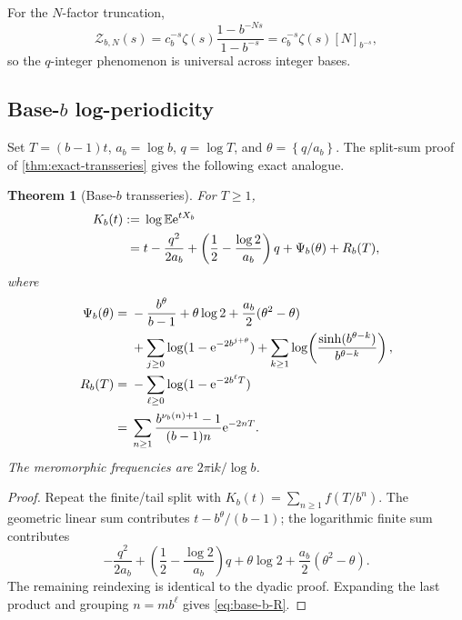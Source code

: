 \documentclass[11pt,oneside]{article}
\newtheorem{theorem}{Theorem}[section]
\theoremstyle{definition}
\theoremstyle{remark}
\newcommand{\e}{\mathrm e}
\newcommand{\ii}{\mathrm i}
\newcommand{\E}{\mathbb E}
\begin{document}
For the \(N\)-factor truncation,
\begin{equation}
 \mathcal Z_{b,N}(s)
 =c_b^{-s}\zeta(s)
  \frac{1-b^{-Ns}}{1-b^{-s}}
 =c_b^{-s}\zeta(s)[N]_{b^{-s}},
 \label{eq:base-b-qinteger}
\end{equation}
so the \(q\)-integer phenomenon is universal across integer bases.

\subsection{Base-\(b\) log-periodicity}

Set \(T=(b-1)t\), \(a_b=\log b\), \(q=\log T\), and
\(\theta=\left\{q/a_b\right\}\).  The split-sum proof of
\cref{thm:exact-transseries} gives the following exact analogue.

\begin{theorem}[Base-\(b\) transseries]
\label{thm:base-b-transseries}
For \(T\geq1\),
\begin{align}
 K_b(t)
 :={}&\log\E\e^{tX_b}
 \notag\\
 ={}&
 t-\frac{q^2}{2a_b}
 +\left(\frac12-\frac{\log2}{a_b}\right)q
 +\Psi_b(\theta)+R_b(T),
 \label{eq:base-b-K}
\end{align}
where
\begin{align}
 \Psi_b(\theta)
 ={}&
 -\frac{b^\theta}{b-1}
 +\theta\log2+\frac{a_b}{2}(\theta^2-\theta)
 \notag\\
 &+\sum_{j\geq0}\log(1-\e^{-2b^{j+\theta}})
 +\sum_{k\geq1}
   \log\!\left(\frac{\sinh(b^{\theta-k})}{b^{\theta-k}}\right),
 \label{eq:base-b-Psi}\\
 R_b(T)
 ={}&
 -\sum_{\ell\geq0}\log(1-\e^{-2b^\ell T})
 \notag\\
 ={}&
 \sum_{n\geq1}
 \frac{b^{\nu_b(n)+1}-1}{(b-1)n}\e^{-2nT}.
 \label{eq:base-b-R}
\end{align}
The meromorphic frequencies are
\(2\pi\ii k/\log b\).
\end{theorem}

\begin{proof}
Repeat the finite/tail split with
\(K_b(t)=\sum_{n\geq1}f(T/b^n)\).  The geometric linear sum contributes
\(t-b^\theta/(b-1)\); the logarithmic finite sum contributes
\[
 -\frac{q^2}{2a_b}
 +\left(\frac12-\frac{\log2}{a_b}\right)q
 +\theta\log2+\frac{a_b}{2}(\theta^2-\theta).
\]
The remaining reindexing is identical to the dyadic proof.  Expanding the
last product and grouping \(n=mb^\ell\) gives \eqref{eq:base-b-R}.
\end{proof}
\end{document}
